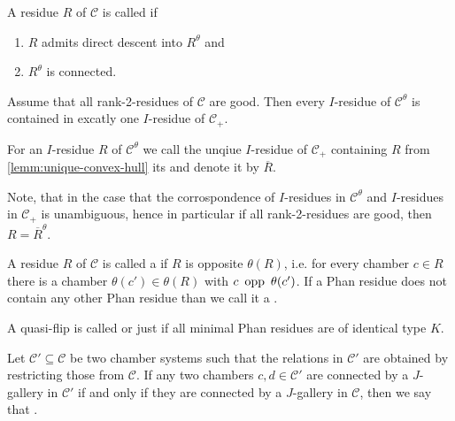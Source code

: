 \begin{defi}
	A residue $R$ of $\mathcal{C}$ is called  if
	\begin{enumerate}
		\item $R$ admits direct descent into $R^\theta$ and
		\item $R^\theta$ is connected.
	\end{enumerate}
\end{defi}

\begin{lemm}
	Assume that all rank-2-residues of $\mathcal C$ are good. Then every $I$-residue of $\mathcal C^\theta$ is contained in excatly one $I$-residue of $\mathcal C_+$.
\end{lemm}

\begin{defi}
	For an $I$-residue $R$ of $\mathcal C^\theta$ we call the unqiue $I$-residue of $\mathcal C_+$ containing $R$ from \ref{lemm:unique-convex-hull} its  and denote it by $\overline R$.
\end{defi}

\begin{rema}
	Note, that in the case that the corrospondence of $I$-residues in $\mathcal C^\theta$ and $I$-residues in $\mathcal C_+$ is unambiguous, hence in particular if all rank-2-residues are good, then $R = \overline R^\theta$.
\end{rema}

\begin{defi}
	A residue $R$ of $\mathcal{C}$ is called a  if $R$ is opposite $\theta(R)$, i.e. for every chamber $c \in R$ there is a chamber $\theta(c') \in \theta(R)$ with $c \opp \theta(c')$. If a Phan residue does not contain any other Phan residue than we call it a .
\end{defi}

\begin{defi}
	A quasi-flip is called  or just  if all minimal Phan residues are of identical type $K$.
\end{defi}

\begin{defi}
	Let $\mathcal C' \subseteq \mathcal C$ be two chamber systems such that the relations in $\mathcal C'$ are obtained by restricting those from $\mathcal C$. If any two chambers $c,d \in \mathcal C'$ are connected by a $J$-gallery in $\mathcal C'$ if and only if they are connected by a $J$-gallery in $\mathcal C$, then we say that .
\end{defi}

